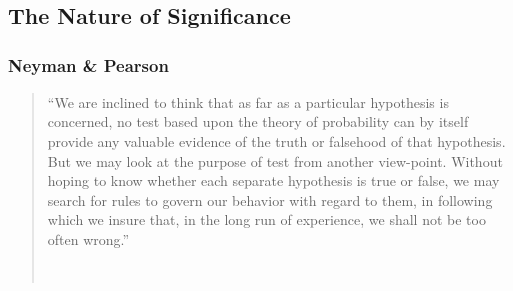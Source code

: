
\newcommand{\hnaught}{\textit{H}\textsubscript{\addfontfeature{Numbers=Lining}0}}
\newcommand{\hone}{\textit{H}\textsubscript{\addfontfeature{Numbers=Lining}1}}


\chapter{\significance}
\label{ch:significance}

\section{The Nature of Significance}
\label{sec:significancenature}

\subsection{Neyman \& Pearson}


\begin{quote}\small\singlespacing
``We are inclined to think that as far as a particular hypothesis is concerned, no test based upon the theory of probability can by itself provide any valuable evidence of the truth or falsehood of that hypothesis. But we may look at the purpose of test from another view-point. Without hoping to know whether each separate hypothesis is true or false, we may search for rules to govern our behavior with regard to them, in following which we insure that, in the long run of experience, we shall not be too often wrong.''

~ \hfill \citep[]{neyman33}
\end{quote}


